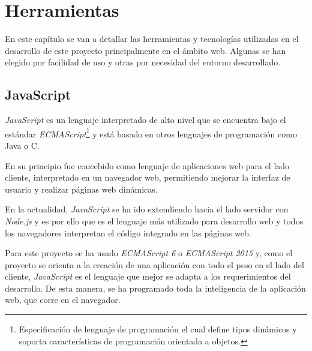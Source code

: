 \chapter{Herramientas}
\label{chap:herramientas}
En este capítulo se van a detallar las herramientas y tecnologías utilizadas en el desarrollo de este proyecto principalmente en el ámbito web. Algunas se han elegido por facilidad de uso y otras por necesidad del entorno desarrollado.

\section{JavaScript}
\label{sec:js}
\textit{JavaScript} es un lenguaje interpretado de alto nivel que se encuentra bajo el estándar \textit{ECMAScript}\footnote{Especificación de lenguaje de programación el cual define tipos dinámicos y soporta características de programación orientada a objetos.} y está basado en otros lenguajes de programación como Java o C. 

En su principio fue concebido como lenguaje de aplicaciones web para el lado cliente, interpretado en un navegador web, permitiendo mejorar la interfaz de usuario y realizar páginas web dinámicas.

En la actualidad, \textit{JavaScript} se ha ido extendiendo hacia el lado servidor con \textit{Node.js} y es por ello que es el lenguaje más utilizado para desarrollo web y todos los navegadores interpretan el código integrado en las páginas web.

Para este proyecto se ha usado \textit{ECMAScript 6} o \textit{ECMAScript 2015} y, como el proyecto se orienta a la creación de una aplicación con todo el peso en el lado del cliente, \textit{JavaScript} es el lenguaje que mejor se adapta a los requerimientos del desarrollo. De esta manera, se ha programado toda la inteligencia de la aplicación web, que corre en el navegador. 

